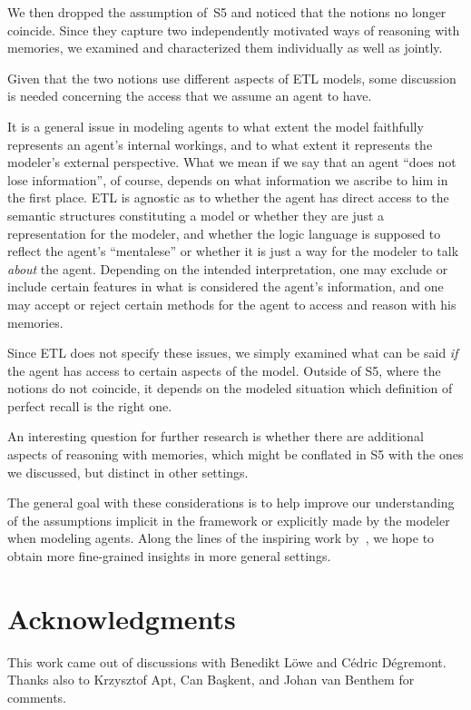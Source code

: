 \documentclass{article}
\newcounter{#1}
\begin{document}
We then dropped the assumption of~S5
and noticed that the notions no longer coincide.
Since they capture two independently motivated ways of reasoning with memories,
we examined and characterized them individually as well as jointly.

\medskip

Given that the two notions use different aspects of ETL models,
some discussion is needed concerning the access that we assume an agent to have.

It is a general issue in modeling agents
to what extent the model faithfully represents an agent's internal workings,
and to what extent it represents the modeler's external perspective.
What we mean if we say that an agent ``does not lose information'', of course,
depends on what information we ascribe to him in the first place.
ETL is agnostic as to whether the agent has direct access to the semantic structures constituting a model
or whether they are just a representation for the modeler,
and whether the logic language is supposed to reflect the agent's ``mentalese''
or whether it is just a way for the modeler to talk \emph{about} the agent.
Depending on the intended interpretation,
one may exclude or include certain features in what is considered the agent's information,
and one may accept or reject certain methods for the agent to access and reason with his memories.

Since ETL does not specify these issues,
we simply examined what can be said \emph{if} the agent has access to certain aspects of the model.
Outside of S5, where the notions do not coincide,
it depends on the modeled situation
which definition of perfect recall is the right one.

\medskip

An interesting question for further research is
whether there are additional aspects of reasoning with memories,
which might be conflated in S5 with the ones we discussed, but distinct in other settings.

\medskip

The general goal with these considerations is
to help improve our understanding of
the assumptions implicit in the framework or explicitly made by the modeler when modeling agents.
Along the lines of the inspiring work by~\citet{van_benthem_merging_2009},
we hope to obtain more fine-grained insights in more general settings.

\section*{Acknowledgments}
\label{sec:acknowledgments}

This work came out of discussions with Benedikt Löwe and Cédric Dégremont.
Thanks also to Krzysztof Apt, Can Başkent, and Johan van Benthem for comments.




\end{document}
